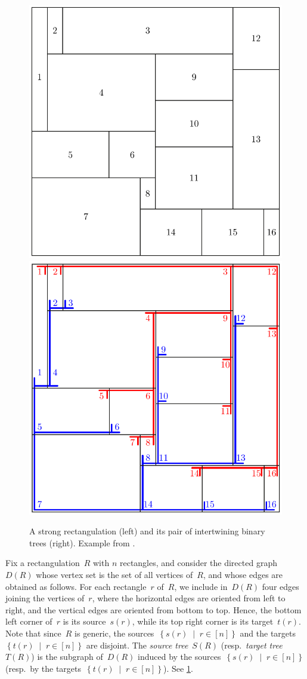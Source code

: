 \documentclass{amsart}
\theoremstyle{definition}
\newcommand{\set}[2]{\left\{ #1 \;\middle|\; #2 \right\}} %
\newcommand{\darkblue}{\color{darkblue}} %
\newcommand{\defn}[1]{\textsl{\darkblue #1}} %
\begin{document}
\begin{figure}
	\centerline{\includegraphics[width=.5\textwidth]{strongRectangulation} \qquad \includegraphics[width=.5\textwidth]{strongRectangulationTrees}}
	\caption{A strong rectangulation (left) and its pair of intertwining binary trees (right). Example from \cite{ACFF24}.}
        \label{fig:strongRectangulation}
\end{figure}

Fix a rectangulation~$R$ with $n$ rectangles, and consider the directed graph~$D(R)$ whose vertex set is the set of all vertices of~$R$, and whose edges are obtained as follows.
For each rectangle~$r$ of~$R$, we include in~$D(R)$ four edges joining the vertices of~$r$, where the horizontal edges are oriented from left to right, and the vertical edges are oriented from bottom to top.
Hence, the bottom left corner of~$r$ is its source~$s(r)$, while its top right corner is its target~$t(r)$.
Note that since~$R$ is generic, the sources~$\set{s(r)}{r \in [n]}$ and the targets~$\set{t(r)}{r \in [n]}$ are disjoint.
The \defn{source tree}~$S(R)$ (resp.~\defn{target tree}~$T(R)$) is the subgraph of~$D(R)$ induced by the sources~$\set{s(r)}{r \in [n]}$ (resp.~by the targets~$\set{t(r)}{r \in [n]}$).
See \cref{fig:strongRectangulation}.
\end{document}
